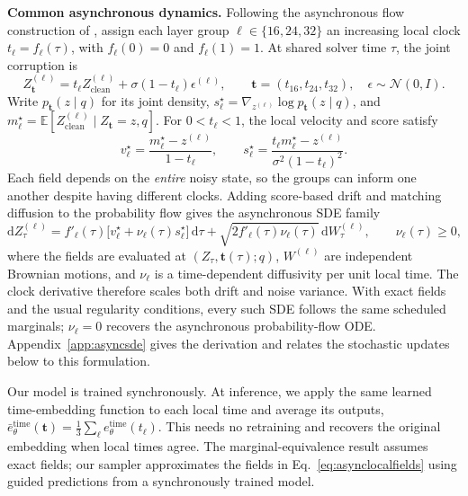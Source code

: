 \documentclass[11pt,letterpaper]{article}
\newcommand{\E}{\mathbb{E}}
\begin{document}
\textbf{Common asynchronous dynamics.}
Following the asynchronous flow construction of \citet{asyncschedules}, assign each layer group $\ell\in\{16,24,32\}$ an increasing local clock $t_\ell=f_\ell(\tau)$, with $f_\ell(0)=0$ and $f_\ell(1)=1$. At shared solver time $\tau$, the joint corruption is
\begin{equation}
 Z_{\bm t}^{(\ell)}=t_\ell Z_{\mathrm{clean}}^{(\ell)}
 +\sigma(1-t_\ell)\epsilon^{(\ell)},
 \qquad \bm t=(t_{16},t_{24},t_{32}),\quad \epsilon\sim\mathcal N(0,I).
 \label{eq:asynccorruption}
\end{equation}
Write $p_{\bm t}(z\mid q)$ for its joint density, $s_\ell^\star=\nabla_{z^{(\ell)}}\log p_{\bm t}(z\mid q)$, and $m_\ell^\star=\E[Z_{\mathrm{clean}}^{(\ell)}\mid Z_{\bm t}=z,q]$. For $0<t_\ell<1$, the local velocity and score satisfy
\begin{equation}
 v_\ell^\star=\frac{m_\ell^\star-z^{(\ell)}}{1-t_\ell},
 \qquad
 s_\ell^\star=\frac{t_\ell m_\ell^\star-z^{(\ell)}}{\sigma^2(1-t_\ell)^2}.
 \label{eq:asynclocalfields}
\end{equation}
Each field depends on the \emph{entire} noisy state, so the groups can inform one another despite having different clocks. Adding score-based drift and matching diffusion to the probability flow gives the asynchronous SDE family \citep{edm}
\begin{equation}
 \mathrm d Z_\tau^{(\ell)}
 =f'_\ell(\tau)\bigl[v_\ell^\star+\nu_\ell(\tau)s_\ell^\star\bigr]\,\mathrm d\tau
 +\sqrt{2f'_\ell(\tau)\nu_\ell(\tau)}\,\mathrm d W_\tau^{(\ell)},
 \qquad \nu_\ell(\tau)\geq0,
 \label{eq:asyncsde}
\end{equation}
where the fields are evaluated at $(Z_\tau,\bm t(\tau);q)$, $W^{(\ell)}$ are independent Brownian motions, and $\nu_\ell$ is a time-dependent diffusivity per unit local time. The clock derivative therefore scales both drift and noise variance. With exact fields and the usual regularity conditions, every such SDE follows the same scheduled marginals; $\nu_\ell=0$ recovers the asynchronous probability-flow ODE. Appendix~\ref{app:asyncsde} gives the derivation and relates the stochastic updates below to this formulation.

Our model is trained synchronously. At inference, we apply the same learned time-embedding function to each local time and average its outputs, $\bar e_\theta^{\mathrm{time}}(\bm t)=\frac13\sum_\ell e_\theta^{\mathrm{time}}(t_\ell)$. This needs no retraining and recovers the original embedding when local times agree. The marginal-equivalence result assumes exact fields; our sampler approximates the fields in Eq.~\eqref{eq:asynclocalfields} using guided predictions from a synchronously trained model.
\end{document}
